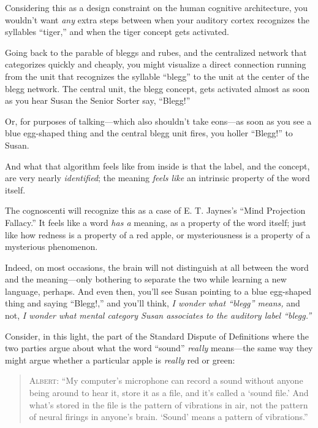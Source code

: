 {{{
 Considering this as a design constraint on the human cognitive
architecture, you wouldn't want \textit{any} extra
steps between when your auditory cortex recognizes the syllables
``tiger,'' and when the tiger
concept gets activated.}

{
 Going back to the parable of bleggs and rubes, and the centralized
network that categorizes quickly and cheaply, you might visualize a
direct connection running from the unit that recognizes the syllable
``blegg'' to the unit at the center
of the blegg network. The central unit, the blegg concept, gets
activated almost as soon as you hear Susan the Senior Sorter say,
``Blegg!''}

{
 Or, for purposes of talking---which also shouldn't
take eons---as soon as you see a blue egg-shaped thing and the central
blegg unit fires, you holler
``Blegg!'' to Susan.}

{
 And what that algorithm feels like from inside is that the label,
and the concept, are very nearly \textit{identified}; the meaning
\textit{feels like} an intrinsic property of the word itself.}

{
 The cognoscenti will recognize this as a case of E. T.
Jaynes's ``Mind Projection
Fallacy.'' It feels like a word \textit{has a}
meaning, as a property of the word itself; just like how redness is a
property of a red apple, or mysteriousness is a property of a
mysterious phenomenon.}

{
 Indeed, on most occasions, the brain will not distinguish at all
between the word and the meaning---only bothering to separate the two
while learning a new language, perhaps. And even then,
you'll see Susan pointing to a blue egg-shaped thing
and saying ``Blegg!,'' and
you'll think, \textit{I wonder what
``blegg'' means,} and not, \textit{I
wonder what mental category Susan associates to the auditory label
``blegg.''}}

{
 Consider, in this light, the part of the Standard Dispute of
Definitions where the two parties argue about what the word
``sound'' \textit{really}
means---the same way they might argue whether a particular apple is
\textit{really} red or green:}

\begin{quotation}
{
 \textsc{Albert}: ``My computer's
microphone can record a sound without anyone being around to hear it,
store it as a file, and it's called a
`sound file.' And what's
stored in the file is the pattern of vibrations in air, not the pattern
of neural firings in anyone's brain.
`Sound' means a pattern of
vibrations.''}


\end{quotation}}}
